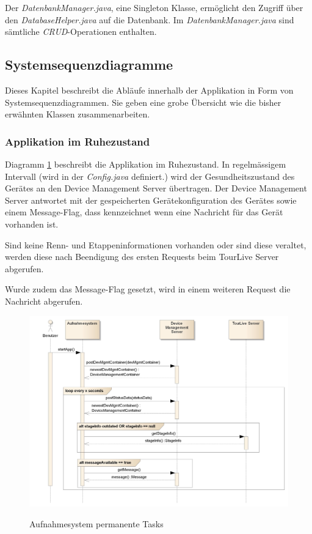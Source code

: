 Der \textit{DatenbankManager.java}, eine Singleton Klasse, ermöglicht den Zugriff über den \textit{DatabaseHelper.java} auf die Datenbank. Im \textit{DatenbankManager.java} sind sämtliche \textit{\gls{CRUD}}-Operationen enthalten.

\subsection{Systemsequenzdiagramme}
Dieses Kapitel beschreibt die Abläufe innerhalb der Applikation in Form von Systemsequenzdiagrammen. Sie geben eine grobe Übersicht wie die bisher erwähnten Klassen zusammenarbeiten.

\subsubsection{Applikation im Ruhezustand}
Diagramm \ref{fig:permanenttasks} beschreibt die Applikation im Ruhezustand. In regelmässigem Intervall (wird in der \textit{Config.java} definiert.) wird der Gesundheitszustand des Gerätes an den Device Management Server übertragen. Der Device Management Server antwortet mit der gespeicherten Gerätekonfiguration des Gerätes sowie einem Message-Flag, dass kennzeichnet wenn eine Nachricht für das Gerät vorhanden ist. 

Sind keine Renn- und Etappeninformationen vorhanden oder sind diese veraltet, werden diese nach Beendigung des ersten Requests beim TourLive Server abgerufen.

Wurde zudem das Message-Flag gesetzt, wird in einem weiteren Request die Nachricht abgerufen. 

 
\begin{figure}[H]
	\centering
	\includegraphics[width=150mm]{images/android/permanent_taskes.jpg}
	\label{fig:permanenttasks}
	\caption{Aufnahmesystem permanente Tasks}
\end{figure}

